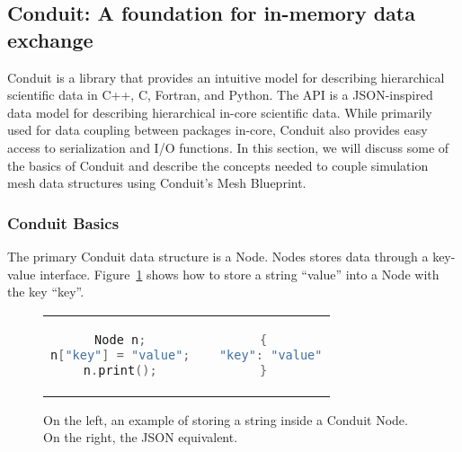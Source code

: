 \subsection{Conduit: A foundation for in-memory data exchange}
Conduit is a library that provides an intuitive model for describing
hierarchical scientific data in C++, C, Fortran, and Python.
%
The API is a JSON-inspired data model for describing hierarchical
in-core scientific data.
%
While primarily used for data coupling between packages in-core,
Conduit also provides easy access to serialization and I/O functions.
%
In this section, we will discuss some of the basics of Conduit
and describe the concepts needed to couple simulation mesh
data structures using Conduit's Mesh Blueprint.


\subsubsection{Conduit Basics}
The primary Conduit data structure is a Node.
%
Nodes stores data through a key-value interface.
%
Figure~\ref{ex:1} shows how to store a string ``value'' into a Node
with the key ``key''.

\begin{figure}
\begin{tabular}{cc}
  \begin{minipage}{.5\textwidth}
  \centering
    \begin{lstlisting}[language=C++]
Node n;
n["key"] = "value";
n.print();
    \end{lstlisting}
  \end{minipage}
  &
  \begin{minipage}{.5\textwidth}
  \centering
  \begin{lstlisting}[language=C++]
{
  "key": "value"
}
  \end{lstlisting}
  \end{minipage}
\end{tabular}
\caption{\label{ex:1}On the left, an example of storing a string inside a Conduit Node. On the right, the JSON equivalent.}
\end{figure}

